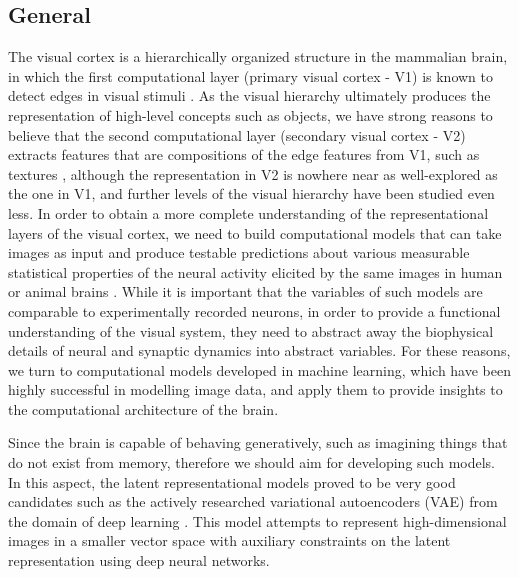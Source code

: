 \documentclass[12pt, english]{article}
\begin{document}
\vspace{7mm}

\subsection{General}

\vspace{7mm}

\par  The visual cortex is a hierarchically organized structure in the mammalian brain, in which the first computational layer (primary visual cortex - V1) is known to detect edges in visual stimuli \cite{hubel1968receptive}.
As the visual hierarchy ultimately produces the representation of high-level concepts such as objects, we have strong reasons to believe that the second computational layer (secondary visual cortex - V2) extracts features that are compositions of the edge features from V1, such as textures \cite{ZiembaV2}, although the representation in V2 is nowhere near as well-explored as the one in V1, and further levels of the visual hierarchy have been studied even less. In order to obtain a more complete understanding of the representational layers of the visual cortex, we need to build computational models that can take images as input and produce testable predictions about various measurable statistical properties of the neural activity elicited by the same images in human or animal brains \cite{yamins2014performance}.
While it is important that the variables of such models are comparable to experimentally recorded neurons, in order to provide a functional understanding of the visual system, they need to abstract away the biophysical details of neural and synaptic dynamics into abstract variables. For these reasons, we turn to computational models developed in machine learning, which have been highly successful in modelling image data, and apply them to provide insights to the computational architecture of the brain.

\vspace{4mm}

\par Since the brain is capable of behaving generatively, such as imagining things that do not exist from memory, therefore we should aim for developing such models. In this aspect, the latent representational models proved to be very good candidates such as the actively researched variational autoencoders (VAE) from the domain of deep learning \cite{kingma2013auto}. This model attempts to represent high-dimensional images in a smaller vector space with auxiliary constraints on the latent representation using deep neural networks.
\end{document}
